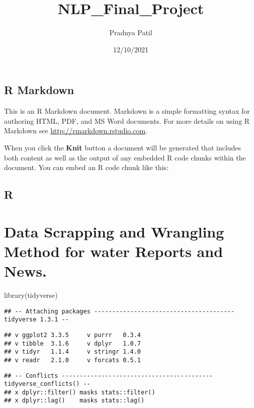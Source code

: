 \documentclass[
]{article}
\title{NLP\_Final\_Project}
\author{Pradnya Patil}
\date{12/10/2021}
\newenvironment{Shaded}{\begin{snugshade}}{\end{snugshade}}
\newcommand{\FunctionTok}[1]{\textcolor[rgb]{0.00,0.00,0.00}{#1}}
\newcommand{\NormalTok}[1]{#1}
\begin{document}
\maketitle

\hypertarget{r-markdown}{%
\subsection{R Markdown}\label{r-markdown}}

This is an R Markdown document. Markdown is a simple formatting syntax
for authoring HTML, PDF, and MS Word documents. For more details on
using R Markdown see \url{http://rmarkdown.rstudio.com}.

When you click the \textbf{Knit} button a document will be generated
that includes both content as well as the output of any embedded R code
chunks within the document. You can embed an R code chunk like this:

\hypertarget{r}{%
\subsection{R}\label{r}}

\hypertarget{data-scrapping-and-wrangling-method-for-water-reports-and-news.}{%
\section{Data Scrapping and Wrangling Method for water Reports and
News.}\label{data-scrapping-and-wrangling-method-for-water-reports-and-news.}}

\begin{Shaded}
\begin{Highlighting}[]
\FunctionTok{library}\NormalTok{(tidyverse)}
\end{Highlighting}
\end{Shaded}

\begin{verbatim}
## -- Attaching packages --------------------------------------- tidyverse 1.3.1 --
\end{verbatim}

\begin{verbatim}
## v ggplot2 3.3.5     v purrr   0.3.4
## v tibble  3.1.6     v dplyr   1.0.7
## v tidyr   1.1.4     v stringr 1.4.0
## v readr   2.1.0     v forcats 0.5.1
\end{verbatim}

\begin{verbatim}
## -- Conflicts ------------------------------------------ tidyverse_conflicts() --
## x dplyr::filter() masks stats::filter()
## x dplyr::lag()    masks stats::lag()
\end{verbatim}
\end{document}
